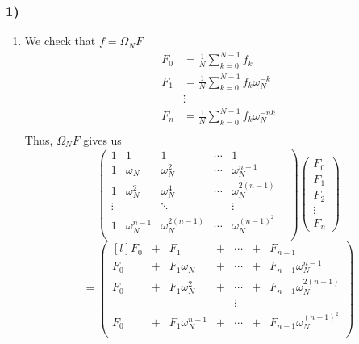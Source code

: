 \subsubsection{1)}

\begin{enumerate}
    \item 
We check that $ f = \Omega_N F $
\begin{align*}
    F_0 &= \frac{ 1 }{ N } \sum_{k=0}^{N-1} f_k \\
    F_1 &= \frac{ 1 }{ N } \sum_{k=0}^{N-1} f_k\omega _{ N }^{ -k } \\
     &\vdots \\ 
    F_n &= \frac{ 1 }{ N } \sum_{k=0}^{N-1} f_k\omega _{ N }^{ -nk } \\
\end{align*}
Thus, $ \Omega_N F  $ gives us 
\[
\begin{pmatrix*}
    1& 1& 1& \cdots&  1 \\
    1&  \omega_N& \omega_N^2& \cdots& \omega_N^{n-1} \\
    1&  \omega_N^2& \omega_N^4& \cdots& \omega_N^{2(n-1)} \\
    \vdots& & \ddots& & \vdots& \\
    1&  \omega_N^{n-1}& \omega_N^{2(n-1)}& \cdots& \omega_N^{(n-1)^2} \\
\end{pmatrix*}
\begin{pmatrix*}
    F_0 \\
    F_1 \\
    F_2 \\
    \vdots \\
    F_n
\end{pmatrix*}
\]
\[
=
\begin{pmatrix*}[l]
    F_0& +& F_1& +& \dotsb& +& F_{n-1}\\
    F_0& +& F_1\omega_N& +& \dotsb& +& F_{n-1}\omega _{ N }^{ n-1 } \\
    F_0& +& F_1\omega _{ N }^{ 2 }& +& \dotsb& +& F_{n-1}\omega _{ N }^{ 2(n-1) } \\
       &  &     &  & \vdots & &\\
    F_0& +& F_1\omega _{ N }^{ n-1 }&  +& \dotsb& +& F_{n-1}\omega _{ N }^{ \left( n-1\right) ^2 } \\
\end{pmatrix*}
\] 


\end{enumerate}
